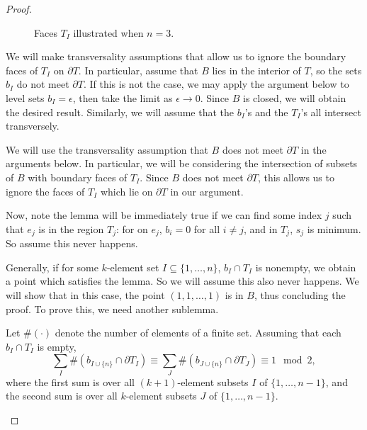 \begin{proof}
\begin{figure}
	
	\caption{Faces $T_I$ illustrated when $n=3$.}
	\label{fig:lemma-fix}
\end{figure}

We will make transversality assumptions that allow us to ignore the
boundary faces of $T_I$ on $\partial T$.  In particular, assume that
$B$ lies in the interior of $T$, so the sets $b_I$ do not meet
$\partial T$.  If this is not the case, we may apply the argument
below to level sets $b_I = \epsilon$, then take the limit as $\epsilon
\to 0$.  Since $B$ is closed, we will obtain the desired result.
Similarly, we will assume that the $b_I$'s and the $T_I$'s all
intersect transversely.

We will use the transversality assumption that $B$ does not meet
$\partial T$ in the arguments below.  In particular, we will be
considering the intersection of subsets of $B$ with boundary faces of
$T_I$.  Since $B$ does not meet $\partial T$, this allows us to ignore
the faces of $T_I$ which lie on $\partial T$ in our argument.


Now, note the lemma will be immediately true if we can find some index
$j$ such that $e_j$ is in the region $T_j$: for on $e_j$, $b_i=0$ for
all $i\neq j$, and in $T_j$, $s_j$ is minimum.  So assume this never
happens.

Generally, if for some $k$-element set $I \subseteq \{1, \dots, n\}$,
$b_I \cap T_I$ is nonempty, we obtain a point which satisfies the
lemma.  So we will assume this also never happens.  We will show that
in this case, the point $(1, 1, \dots, 1)$ is in $B$, thus concluding
the proof.  To prove this, we need another sublemma.

\begin{lemma}
Let $\#(\cdot)$ denote the number of elements of a finite set.
Assuming that %
each %
$b_I \cap T_I$ is empty, 
$$\sum_I \#(b_{I\cup\{n\}} \cap \partial T_I) \equiv \sum_{J}
\#(b_{J\cup\{n\}} \cap \partial T_J) \equiv 1 \mod 2,$$
where the first
sum is over all $(k+1)$-element subsets $I$ of $\{1, \dots, n-1\}$,
and the second sum is over all $k$-element subsets $J$ of $\{1, \dots,
n-1\}$.
\label{lemma:inductive-S}
\end{lemma}


\end{proof}

